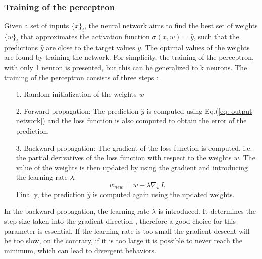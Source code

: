 \subsubsection{Training of the perceptron}

Given a set of inputs $\{x\}_i$, the neural network aims to find the best set of weights $\{w\}_i$ that approximates the activation function $\sigma(x,w)=\hat{y}$, such that the predictions $\hat{y}$ are close to the target values $y$. The optimal values of the weights are found by training the network. For simplicity, the training of the perceptron, with only 1 neuron is presented, but this can be generalized to k neurons. The training of the perceptron consists of three steps \cite{neutrinoslides}:

\begin{itemize}
    \item[1.] Random initialization of the weights $w$
    \item[2.] Forward propagation: The prediction $\hat{y}$ is computed using Eq.(\ref{eq: output network}) and the loss function is also computed to obtain the error of the prediction.
    \item[3.] Backward propagation: The gradient of the loss function is computed, i.e. the partial derivatives of the loss function with respect to the weights $w$. The value of the weights is then updated by using the gradient and introducing the learning rate $\lambda$:
    \begin{equation}
        w_{new}=w-\lambda \nabla_w L
    \end{equation}
    Finally, the prediction $\hat{y}$ is computed again using the updated weights.
\end{itemize}

In the backward propagation, the learning rate $\lambda$ is introduced. It determines the step size taken into the gradient direction \cite{Learning_rate}, therefore a good choice for this parameter is essential. 
If the learning rate is too small the gradient descent will be too slow, on the contrary, if it is too large it is possible to never reach the minimum, which can lead to divergent behaviors.

